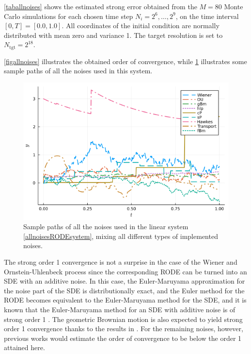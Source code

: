 \documentclass[reqno,12pt]{amsart}
\theoremstyle{plain} %
\theoremstyle{definition} %
\begin{document}
\cref{taballnoises} shows the estimated strong error obtained from the $M = 80$ Monte Carlo simulations for each chosen time step $N_i = 2^6, \ldots, 2^9$,  on the time interval $[0, T] = [0.0, 1.0]$. All coordinates of the initial condition are normally distributed with mean zero and variance 1. The target resolution is set to $N_{\textrm{tgt}} = 2^{18}$.

\cref{figallnoises} illustrates the obtained order of convergence, while \cref{figsamplepathsallnoises} illustrates some sample paths of all the noises used in this system.

\begin{figure}[htb]
    \includegraphics[scale=0.6]{img/noisepath_allnoises.png}
    \caption{Sample paths of all the noises used in the linear system \eqref{allnoisesRODEsystem}, mixing all different types of implemented noises.}
    \label{figsamplepathsallnoises}
\end{figure}

The strong order 1 convergence is not a surprise in the case of the Wiener and Ornstein-Uhlenbeck process since the corresponding RODE can be turned into an SDE with an additive noise. In this case, the Euler-Maruyama approximation for the noise part of the SDE is distributionally exact, and the Euler method for the RODE becomes equivalent to the Euler-Maruyama method for the SDE, and it is known that the Euler-Maruyama method for an SDE with additive noise is of strong order 1 \cite{HighamKloeden2021}. The geometric Brownian motion is also expected to yield strong order 1 convergence thanks to the results in \cite{WangCaoHanKloeden2021}. For the remaining noises, however, previous works would estimate the order of convergence to be below the order 1 attained here.
\end{document}
